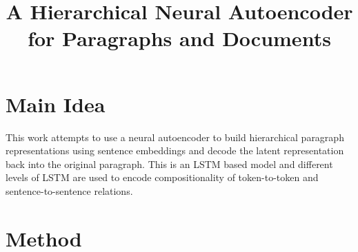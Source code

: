 \documentclass[12pt]{article}
\begin{document}
\title{A Hierarchical Neural Autoencoder for Paragraphs and Documents}
\author{}
\date{}
\maketitle

\section{Main Idea}
  This work attempts to use a neural autoencoder to build hierarchical paragraph representations using sentence embeddings and decode the latent representation back into the original paragraph. This is an LSTM based model and different levels of LSTM are used to encode compositionality of token-to-token and sentence-to-sentence relations.

\section{Method}
\end{document}

